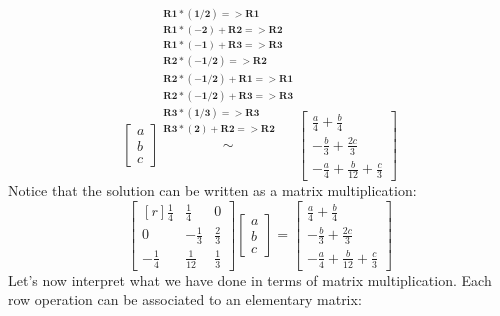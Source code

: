 \documentclass[12pt]{article}
\begin{document}
\[
\begin{bmatrix}a\\b\\c\end{bmatrix}
\stackrel
{
\begin{matrix}
\scriptstyle{\mathbf{R1*(1/2)=>R1}}\\
\scriptstyle{\mathbf{R1*(-2)+R2=>R2}}\\
\scriptstyle{\mathbf{R1*(-1)+R3=>R3}}\\
\scriptstyle{\mathbf{R2*(-1/2)=>R2}}\\
\scriptstyle{\mathbf{R2*(-1/2)+R1=>R1}}\\
\scriptstyle{\mathbf{R2*(-1/2)+R3=>R3}}\\
\scriptstyle{\mathbf{R3*(1/3)=>R3}}\\
\scriptstyle{\mathbf{R3*(2)+R2=>R2}}\\
\end{matrix}
}
{\sim}
\left[\begin{matrix}\frac{a}{4} + \frac{b}{4}\\- \frac{b}{3} + \frac{2 c}{3}\\- \frac{a}{4} + \frac{b}{12} + \frac{c}{3}\end{matrix}\right]
\]
Notice that the solution can be written as a matrix multiplication:
\[
\left[\begin{matrix*}[r]\frac{1}{4} & \frac{1}{4} & 0\\0 & - \frac{1}{3} & \frac{2}{3}\\- \frac{1}{4} & \frac{1}{12} & \frac{1}{3}\end{matrix*}\right]
\begin{bmatrix}a\\b\\c\end{bmatrix}=
\left[\begin{matrix}\frac{a}{4} + \frac{b}{4}\\- \frac{b}{3} + \frac{2 c}{3}\\- \frac{a}{4} + \frac{b}{12} + \frac{c}{3}\end{matrix}\right]
\]
Let's now interpret what we have done in terms of matrix multiplication. Each row operation can be associated to an elementary matrix:
\end{document}
